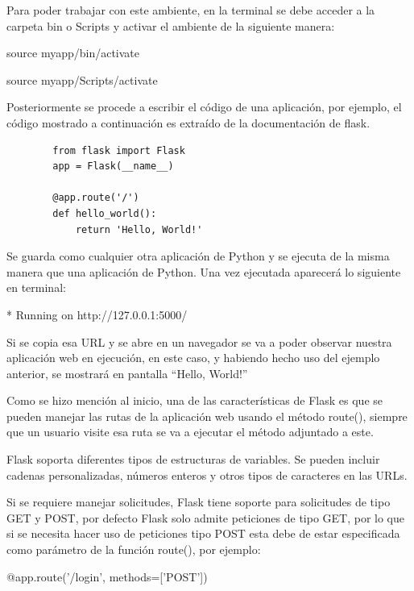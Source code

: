 \documentclass[12pt, a4paper, titlepage]{report}
\begin{document}
		Para poder trabajar con este ambiente, en la terminal se debe acceder a la carpeta bin o Scripts y activar el ambiente de la siguiente manera:\par
		\begin{center}
		source myapp/bin/activate\par
		source myapp/Scripts/activate
		\end{center}
		Posteriormente se procede a escribir el código de una aplicación, por ejemplo, el código mostrado a continuación es extraído de la documentación de flask.\cite{refFlask1}
		\begin{verbatim}
		from flask import Flask  
		app = Flask(__name__) 

		@app.route('/')  
		def hello_world():  
		    return 'Hello, World!'  
		\end{verbatim}
		Se guarda como cualquier otra aplicación de Python y se ejecuta de la misma manera que una aplicación de Python. Una vez ejecutada aparecerá lo siguiente en terminal:\par
		\begin{center}
		* Running on http://127.0.0.1:5000/
		\end{center}
		Si se copia esa URL y se abre en un navegador se va a poder observar nuestra aplicación web en ejecución, en este caso, y habiendo hecho uso del ejemplo anterior, se mostrará en pantalla “Hello, World!”\par
		Como se hizo mención al inicio, una de las características de Flask es que se pueden manejar las rutas de la aplicación web usando el método route(), siempre que un usuario visite esa ruta se va a ejecutar el método adjuntado a este.\par
		Flask soporta diferentes tipos de estructuras de variables. Se pueden incluir cadenas personalizadas, números enteros y otros tipos de caracteres en las URLs.\par
		Si se requiere manejar solicitudes, Flask tiene soporte para solicitudes de tipo GET y POST, por defecto Flask solo admite peticiones de tipo GET, por lo que si se necesita hacer uso de peticiones tipo POST esta debe de estar especificada como parámetro de la función route(), por ejemplo:\par
		\begin{center}
		@app.route('/login', methods=['POST'])
		\end{center}
		
\end{document}
